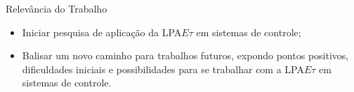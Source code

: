 \begin{frame}{Relevância do Trabalho}
\begin{alertblock}{ }
  \begin{itemize}
    \item Iniciar pesquisa de aplicação da LPA$E\tau$ em sistemas de controle;
  \end{itemize}
\end{alertblock}
\begin{alertblock}{ }
  \begin{itemize}
    \item Balisar um novo caminho para trabalhos futuros, expondo pontos positivos, dificuldades iniciais e possibilidades para se trabalhar com a LPA$E\tau$ em sistemas de controle.
  \end{itemize}
\end{alertblock}
\end{frame}
